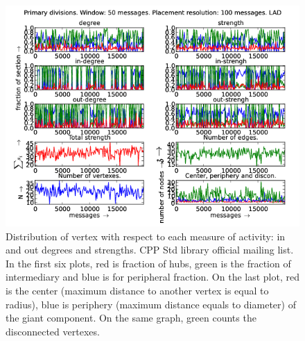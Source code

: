 \documentclass[%
 aip,
 jmp,%
 amsmath,amssymb,
 reprint,%
]{revtex4-1}
\begin{document}
\begin{figure}[hbtp] 
   \centering
        \includegraphics[width=\textwidth]{figs/LAD/50}
    \caption{Distribution of vertex with respect to each measure of activity: in and out degrees and strengths. CPP Std library official mailing list. In the first six plots, red is fraction of hubs, green is the fraction of intermediary and blue is for peripheral fraction. On the last plot, red is the center (maximum distance to another vertex is equal to radius), blue is periphery (maximum distance equals to diameter) of the giant component. On the same graph, green counts the disconnected vertexes.}
    \label{fig:lad50}
\end{figure}
\end{document}
